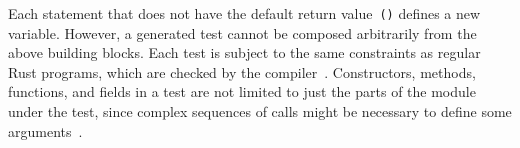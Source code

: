 \documentclass{article}
\begin{document}

Each statement that does not have the default return value~\lstinline{()} defines a new variable. However, a generated test cannot be composed arbitrarily from the above building blocks. Each test is subject to the same constraints as regular Rust programs, which are checked by the compiler~\cite{Tonella2004}. Constructors, methods, functions, and fields in a test are not limited to just the parts of the module under the test, since complex sequences of calls might be necessary to define some arguments~\cite{Fraser2012}. 

\end{document}
